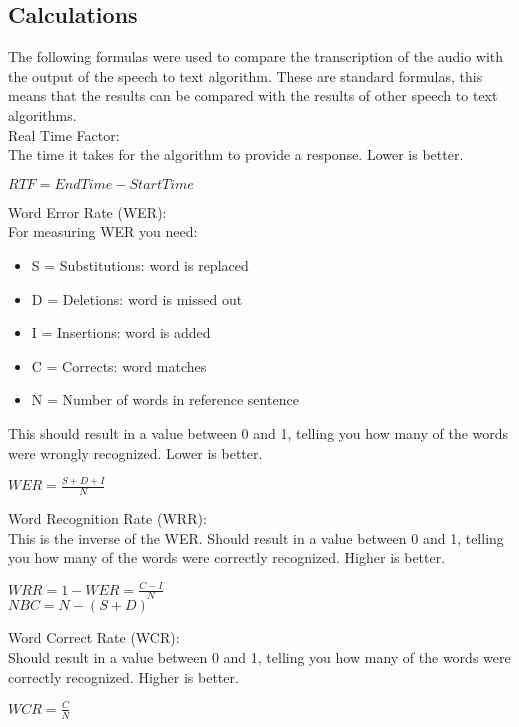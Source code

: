 \documentclass{article}
\begin{document}
\subsection{Calculations}
The following formulas were used to compare the transcription of the audio with the output of the speech to text algorithm. These are standard formulas, this means that the results can be compared with the results of other speech to text algorithms. \\

    Real Time Factor: \\
    The time it takes for the algorithm to provide a response. Lower is better.
    \begin{center}
    $ RTF = End Time - Start Time$ \\
    \end{center} 

    Word Error Rate (WER): \\
    For measuring WER you need:
    \begin{itemize}
        \item S = Substitutions:  word is replaced
        \item D = Deletions:  word is missed out
        \item I = Insertions:  word is added
        \item C = Corrects:  word matches
        \item N = Number of words in reference sentence
    \end{itemize}
    This should result in a value between 0 and 1, telling you how many of the words were wrongly recognized. Lower is better.
    \begin{center}
    $ WER = \frac{S + D + I}{N}$ \\
    \end{center} 
    
    Word Recognition Rate (WRR): \\
    This is the inverse of the WER. Should result in a value between 0 and 1, telling you how many of the words were correctly recognized. Higher is better.
    \begin{center}
    $ WRR = 1 - WER = \frac{C - I}{N}$ \\
    $ NBC =N - (S + D)$ \\
    \end{center} 
    
    Word Correct Rate (WCR): \\
    Should result in a value between 0 and 1, telling you how many of the words were correctly recognized. Higher is better.
    \begin{center}
    $ WCR = \frac{C}{N}$ \\
    \end{center} 
    
\end{document}
